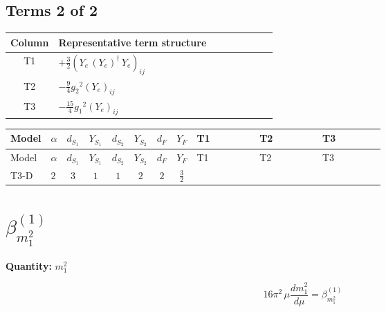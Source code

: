 \documentclass[8pt]{article}
\begin{document}
\begin{landscape}
\subsection*{Terms 2 of 2}
\begin{center}
\begin{tabular}{@{}c >{\raggedright\arraybackslash}p{0.82\linewidth}@{}}
\toprule
Column & Representative term structure \\
\midrule
T1 & \(\displaystyle +\frac{3}{2} \left({Y_e}\,\left({Y_e}\right)^{\dagger}\,{Y_e}\right)_{ij}\) \\
\midrule
T2 & \(\displaystyle -\frac{9}{4} {g_2}^2 \left({Y_e}\right)_{ij}\) \\
\midrule
T3 & \(\displaystyle -\frac{15}{4} {g_1}^2 \left({Y_e}\right)_{ij}\) \\
\midrule
\bottomrule
\end{tabular}
\end{center}
\smallskip
\tiny
\begin{longtable}{@{}llcccccc >{\raggedright\arraybackslash}p{0.21\linewidth} >{\raggedright\arraybackslash}p{0.21\linewidth} >{\raggedright\arraybackslash}p{0.21\linewidth}@{}}
\toprule
Model & $\alpha$ & $d_{S_1}$ & $Y_{S_1}$ & $d_{S_2}$ & $Y_{S_2}$ & $d_F$ & $Y_F$ & T1 & T2 & T3 \\
\midrule
\endfirsthead
\toprule
Model & $\alpha$ & $d_{S_1}$ & $Y_{S_1}$ & $d_{S_2}$ & $Y_{S_2}$ & $d_F$ & $Y_F$ & T1 & T2 & T3 \\
\midrule
\endhead
T3-D & $2$ & $3$ & $1$ & $1$ & $2$ & $2$ & $\frac{3}{2}$ & \scriptsize\adjustbox{max width=\linewidth}{$\begin{gathered} +\frac{3}{2} \left({Y_e}\,\left({Y_e}\right)^{\dagger}\,{Y_e}\right)_{ij}\end{gathered}$} & \scriptsize\adjustbox{max width=\linewidth}{$\begin{gathered} -\frac{9}{4} {g_2}^2 \left({Y_e}\right)_{ij}\end{gathered}$} & \scriptsize\adjustbox{max width=\linewidth}{$\begin{gathered} -\frac{15}{4} {g_1}^2 \left({Y_e}\right)_{ij}\end{gathered}$} \\
\midrule
\bottomrule
\end{longtable}
\clearpage
\section*{$\beta_{m_1^2}^{(1)}$}
\noindent\textbf{Quantity: }$m_1^2$\par\smallskip
\[16\pi^2\,\mu\frac{d m_1^2}{d\mu}=\beta_{m_1^2}^{(1)}\]

\end{landscape}
\end{document}
